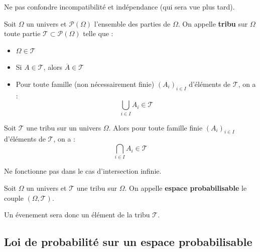 \documentclass[a4paper,12pt]{article}
\begin{document}
\begin{remarque}
    Ne pas confondre incompatibilité et indépendance (qui sera vue plus tard).
\end{remarque}

\begin{definition}
    Soit $\Omega$ un univers et $\mathcal{P}(\Omega)$ l'ensemble des parties de $\Omega$.
    On appelle \textbf{tribu} sur $\Omega$ toute partie $\mathcal{T} \subset \mathcal{P}(\Omega)$ telle que :
    \begin{itemize}[label=--]
        \item $\Omega \in \mathcal{T}$
        \item Si $A \in \mathcal{T}$, alors $\overline{A} \in \mathcal{T}$
        \item Pour toute famille (non nécessairement finie) $(A_i)_{i \in I}$ d'éléments de $\mathcal{T}$, on a :
        $$
        \bigcup_{i \in I} A_i \in \mathcal{T}
        $$
    \end{itemize}
\end{definition}

\begin{proposition}{}{}
    Soit $\mathcal{T}$ une tribu sur un univers $\Omega$.
    Alors pour toute famille finie $(A_i)_{i \in I}$ d'éléments de $\mathcal{T}$, on a :
    $$
    \bigcap_{i \in I} A_i \in \mathcal{T}
    $$
\end{proposition}

\begin{remarque}
    Ne fonctionne pas dans le cas d'intersection infinie.
\end{remarque}

\begin{definition}
    Soit $\Omega$ un univers et $\mathcal{T}$ une tribu sur $\Omega$.
    On appelle \textbf{espace probabilisable} le couple $(\Omega, \mathcal{T})$.
\end{definition}

\begin{remarque}
    Un évenement sera donc un élément de la tribu $\mathcal{T}$.
\end{remarque}

\subsection{Loi de probabilité sur un espace probabilisable}
\end{document}
